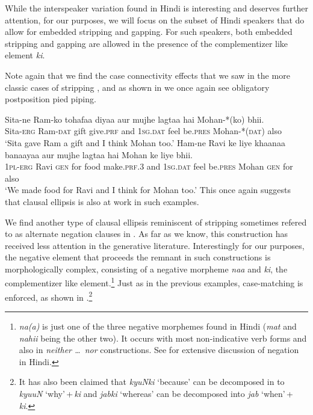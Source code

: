 \documentclass[output=paper]{langscibook}
\begin{document}
While the interspeaker variation found in Hindi is interesting and deserves further attention, for our purposes, we will focus on the subset of Hindi speakers that do allow for embedded stripping and gapping. For such speakers, both embedded stripping and gapping are allowed in the presence of the complementizer like element \emph{ki}.

Note again that we find the case connectivity effects that we saw in the more classic cases of stripping , and as shown in  we once again see obligatory postposition pied piping.

\ea 
    \ea \label{maex15:a}
        \gll Sita-ne Ram-ko tohafaa diyaa aur mujhe lagtaa hai Mohan-*(ko) bhii.\\
        Sita-\textsc{erg} Ram-\textsc{dat} gift give.\textsc{prf} and \textsc{1sg.dat} feel be.\textsc{pres} Mohan-*(\textsc{dat}) also\\
        \glt `Sita gave Ram a gift and I think Mohan too.'
    \ex \label{maex15:b}
        \gll Ham-ne Ravi ke liye khaanaa banaayaa aur mujhe lagtaa hai Mohan ke liye bhii.\\
        \textsc{1pl-erg} Ravi \textsc{gen} for food make.\textsc{prf.3} and \textsc{1sg.dat} feel be.\textsc{pres} Mohan \textsc{gen} for also\\
        \glt `We made food for Ravi and I think for Mohan too.'
    \z 
\z 
This once again suggests that clausal ellipsis is also at work in such examples.

We find another type of clausal ellipsis reminiscent of stripping sometimes refered to as  alternate negation clauses in \citet{Sinha05}. As far as we know, this construction has received less attention in the generative literature.  Interestingly for our purposes, the negative element that proceeds the remnant in such constructions is morphologically complex, consisting of a negative morpheme \emph{naa} and \emph{ki}, the complementizer like element.\footnote{\emph{na(a)} is just one of the three negative morphemes found in Hindi (\emph{mat} and \emph{nahii} being the other two). It occurs with most non-indicative verb forms and also in \emph{neither \dots\ nor} constructions. See \citealt{bhatia95} for extensive discussion of negation in Hindi.} Just as in the previous examples, case-matching is enforced, as shown in .\footnote{It has also been claimed that \emph{kyuNki} `because' can be decomposed in to \emph{kyuuN} `why'\,+\,\emph{ki} and \emph{jabki} `whereas' can be decomposed into \emph{jab} `when'\,+\,\emph{ki}.}
\end{document}
